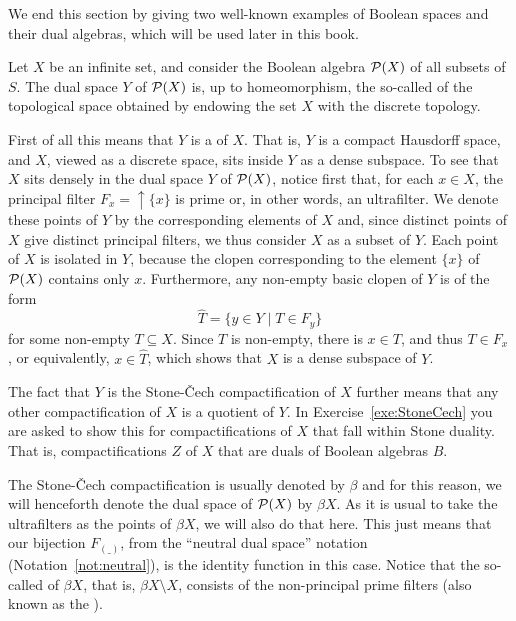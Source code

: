 We end this section by giving two well-known examples of Boolean spaces and their dual algebras, which will be used later in this book.
\begin{example}\label{exa:StoneCechcompactification}
  Let $X$ be an infinite set, and consider the Boolean algebra $\mathcal{P}(X)$ of all subsets of $S$. The dual space $Y$ of $\mathcal{P}(X)$ is, up to homeomorphism, the so-called  of the topological space obtained by endowing the set $X$ with the discrete topology.
  
  First of all this means that $Y$ is a  of $X$. That is, $Y$ is a compact Hausdorff space, and $X$, viewed as a discrete space, sits inside $Y$ as a dense subspace. %
  To see that $X$ sits densely in the dual space $Y$ of $\mathcal{P}(X)$, notice first that, for each $x\in X$, the principal filter $F_x={\uparrow}\{x\}$ is prime or, in other words, an ultrafilter. We denote these points of $Y$ by the corresponding elements of $X$ and, since distinct points of $X$ give distinct principal filters, we thus consider $X$ as a subset of $Y$. Each point of $X$ is isolated in $Y$, because the clopen corresponding to the element $\{x\}$ of $\mathcal{P}(X)$ contains only $x$. Furthermore, any non-empty basic clopen of $Y$ is of the form
  \[
  \widehat{T}=\{y\in Y \mid T\in F_y\}
  \]
  for some non-empty $T\subseteq X$. Since $T$ is non-empty, there is $x\in T$, and thus $T\in F_x$, or equivalently, $x\in \widehat{T}$, which shows that $X$ is a dense subspace of $Y$.
  
  The fact that $Y$ is the Stone-{\v C}ech compactification of $X$ further means that any other compactification of $X$ is a quotient of $Y$. In Exercise~\ref{exe:StoneCech} you are asked to show this for compactifications of $X$ that fall within Stone duality. That is, compactifications $Z$ of $X$ that are duals of Boolean algebras $B$. 
  
  The Stone-{\v C}ech compactification is usually denoted by $\beta$ and for this reason, we will henceforth denote the dual space of $\mathcal{P}(X)$ by $\beta X$. As it is usual to take the ultrafilters as the points of $\beta X$, we will also do that here. This just means that our bijection $F_{(\_)}$, from the ``neutral dual space'' notation (Notation~\ref{not:neutral}), is the identity function in this case. 
  Notice that the so-called  of $\beta X$, that is, $\beta X\setminus X$, consists of the non-principal prime filters (also known as the ).
  \end{example}
  
